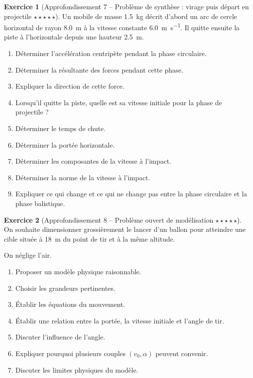 \documentclass[11pt,a4paper]{article}
\theoremstyle{definition}
\newtheorem{exercice}{Exercice}[section]
\newcommand{\etoiles}[1]{\hfill{\small\textbf{#1}}}
\begin{document}
\begin{exercice}[Approfondissement 7 -- Problème de synthèse : virage puis départ en projectile \etoiles{$\star\star\star\star\star$}]
Un mobile de masse \SI{1,5}{kg} décrit d’abord un arc de cercle horizontal de rayon \SI{8,0}{m}
à la vitesse constante \SI{6,0}{m.s^{-1}}.
Il quitte ensuite la piste à l’horizontale depuis une hauteur \SI{2,5}{m}.

\begin{enumerate}[label=\arabic*.]
    \item Déterminer l’accélération centripète pendant la phase circulaire.
    \item Déterminer la résultante des forces pendant cette phase.
    \item Expliquer la direction de cette force.
    \item Lorsqu’il quitte la piste, quelle est sa vitesse initiale pour la phase de projectile ?
    \item Déterminer le temps de chute.
    \item Déterminer la portée horizontale.
    \item Déterminer les composantes de la vitesse à l’impact.
    \item Déterminer la norme de la vitesse à l’impact.
    \item Expliquer ce qui change et ce qui ne change pas entre la phase circulaire et la phase balistique.
\end{enumerate}
\end{exercice}

\begin{exercice}[Approfondissement 8 -- Problème ouvert de modélisation \etoiles{$\star\star\star\star\star$}]
On souhaite dimensionner grossièrement le lancer d’un ballon pour atteindre une cible située à
\SI{18}{m} du point de tir et à la même altitude.

On néglige l’air.

\begin{enumerate}[label=\arabic*.]
    \item Proposer un modèle physique raisonnable.
    \item Choisir les grandeurs pertinentes.
    \item Établir les équations du mouvement.
    \item Établir une relation entre la portée, la vitesse initiale et l’angle de tir.
    \item Discuter l’influence de l’angle.
    \item Expliquer pourquoi plusieurs couples $(v_0,\alpha)$ peuvent convenir.
    \item Discuter les limites physiques du modèle.
\end{enumerate}
\end{exercice}
\end{document}
